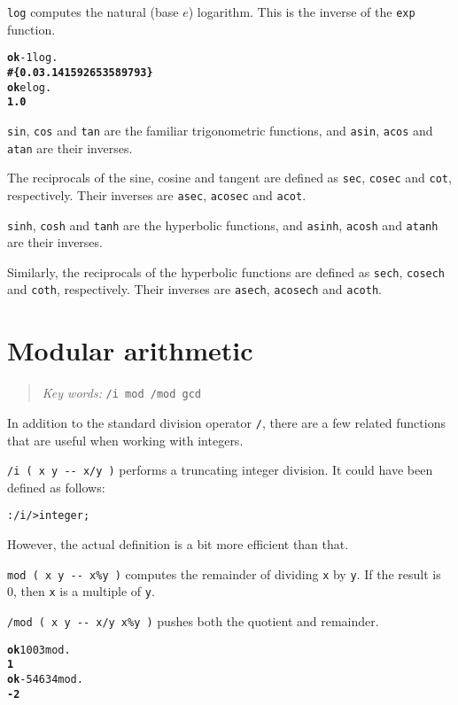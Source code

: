\documentclass[english]{book}
\newcommand{\chapkeywords}[1]{%
\begin{quote}
\emph{Key words:} \texttt{#1}
\end{quote}
}
\begin{document}
\texttt{log} computes the natural (base $e$) logarithm. This is the inverse of the \texttt{exp} function.

\begin{alltt}
\textbf{ok} -1 log .
\textbf{\#\{ 0.0 3.141592653589793 \}}
\textbf{ok} e log .
\textbf{1.0}
\end{alltt}

\texttt{sin}, \texttt{cos} and \texttt{tan} are the familiar trigonometric functions, and \texttt{asin}, \texttt{acos} and \texttt{atan} are their inverses.

The reciprocals of the sine, cosine and tangent are defined as \texttt{sec}, \texttt{cosec} and \texttt{cot}, respectively. Their inverses are \texttt{asec}, \texttt{acosec} and \texttt{acot}.

\texttt{sinh}, \texttt{cosh} and \texttt{tanh} are the hyperbolic functions, and \texttt{asinh}, \texttt{acosh} and \texttt{atanh} are their inverses.

Similarly, the reciprocals of the hyperbolic functions are defined as \texttt{sech}, \texttt{cosech} and \texttt{coth}, respectively. Their inverses are \texttt{asech}, \texttt{acosech} and \texttt{acoth}.

\section{Modular arithmetic}

\chapkeywords{/i mod /mod gcd}

In addition to the standard division operator \texttt{/}, there are a few related functions that are useful when working with integers.

\texttt{/i ( x y -{}- x/y )} performs a truncating integer division. It could have been defined as follows:

\begin{alltt}
: /i / >integer ;
\end{alltt}

However, the actual definition is a bit more efficient than that.

\texttt{mod ( x y -{}- x\%y )} computes the remainder of dividing \texttt{x} by \texttt{y}. If the result is 0, then \texttt{x} is a multiple of \texttt{y}.

\texttt{/mod ( x y -{}- x/y x\%y )} pushes both the quotient and remainder.

\begin{alltt}
\textbf{ok} 100 3 mod .
\textbf{1}
\textbf{ok} -546 34 mod .
\textbf{-2}
\end{alltt}
\end{document}
